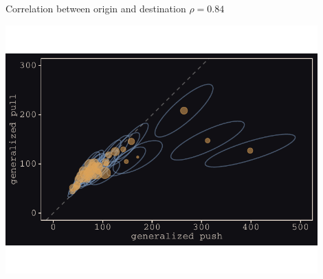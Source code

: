 \documentclass{beamer}
\begin{document}
\begin{frame}{Correlation between origin and destination $\rho= 0.84$}
				\begin{center}
		\includegraphics[width=0.9\textwidth]{../../fig/scatter}
	\end{center}
\end{frame}
\end{document}
